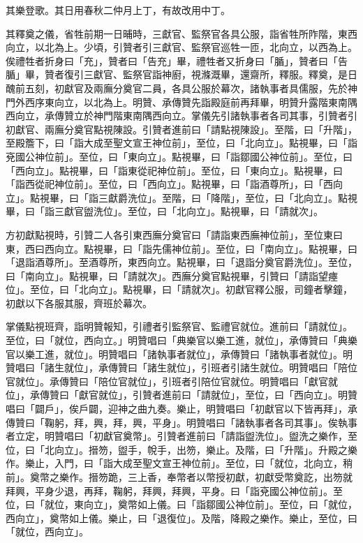 \begin{pinyinscope}
 其樂登歌。其日用春秋二仲月上丁，有故改用中丁。



 其釋奠之儀，省牲前期一日晡時，三獻官、監祭官各具公服，詣省牲所阼階，東西向立，以北為上。少頃，引贊者引三獻官、監祭官巡牲一匝，北向立，以西為上。俟禮牲者折身曰「充」，贊者曰「告充」畢，禮牲者又折身曰「腯」，贊者曰「告腯」畢，贊者復引三獻官、監祭官詣神廚，視滌溉畢，還齋所，釋服。釋奠，是日醜前五刻，初獻官及兩廡分奠官二員，各具公服於幕次，諸執事者具儒服，先於神門外西序東向立，以北為上。明贊、承傳贊先詣殿庭前再拜畢，明贊升露階東南隅西向立，承傳贊立於神門階東南隅西向立。掌儀先引諸執事者各司其事，引贊者引初獻官、兩廡分奠官點視陳設。引贊者進前曰「請點視陳設」。至階，曰「升階」，至殿簷下，曰「詣大成至聖文宣王神位前」，至位，曰「北向立」。點視畢，曰「詣兗國公神位前」。至位，曰「東向立」。點視畢，曰「詣鄒國公神位前」。至位，曰「西向立」。點視畢，曰「詣東從祀神位前」。至位，曰「東向立」。點視畢，曰「詣西從祀神位前」。至位，曰「西向立」。點視畢，曰「詣酒尊所」，曰「西向立」。點視畢，曰「詣三獻爵洗位」。至階，曰「降階」，至位，曰「北向立」。點視畢，曰「詣三獻官盥洗位」。至位，曰「北向立」。點視畢，曰「請就次」。



 方初獻點視時，引贊二人各引東西廡分奠官曰「請詣東西廡神位前」，至位東曰東，西曰西向立。點視畢，曰「詣先儒神位前」。至位，曰「南向立」。點視畢，曰「退詣酒尊所」。至酒尊所，東西向立。點視畢，曰「退詣分奠官爵洗位」。至位，曰「南向立」。點視畢，曰「請就次」。西廡分奠官點視畢，引贊曰「請詣望瘞位」。至位，曰「北向立」。點視畢，曰「請就次」。初獻官釋公服，司鐘者擊鐘，初獻以下各服其服，齊班於幕次。



 掌儀點視班齊，詣明贊報知，引禮者引監祭官、監禮官就位。進前曰「請就位」。至位，曰「就位，西向立。」明贊唱曰「典樂官以樂工進，就位」，承傳贊曰「典樂官以樂工進，就位」。明贊唱曰「諸執事者就位」，承傳贊曰「諸執事者就位」。明贊唱曰「諸生就位」，承傳贊曰「諸生就位」，引班者引諸生就位。明贊唱曰「陪位官就位」。承傳贊曰「陪位官就位」，引班者引陪位官就位。明贊唱曰「獻官就位」，承傳贊曰「獻官就位」，引贊者進前曰「請就位」，至位，曰「西向立」。明贊唱曰「闢戶」，俟戶闢，迎神之曲九奏。樂止，明贊唱曰「初獻官以下皆再拜」，承傳贊曰「鞠躬，拜，興，拜，興，平身」。明贊唱曰「諸執事者各司其事」。俟執事者立定，明贊唱曰「初獻官奠幣」。引贊者進前曰「請詣盥洗位」。盥洗之樂作，至位，曰「北向立」。搢笏，盥手，帨手，出笏，樂止。及階，曰「升階」。升殿之樂作。樂止，入門，曰「詣大成至聖文宣王神位前」。至位，曰「就位，北向立，稍前」。奠幣之樂作。搢笏跪，三上香，奉幣者以幣授初獻，初獻受幣奠訖，出笏就拜興，平身少退，再拜，鞠躬，拜興，拜興，平身。曰「詣兗國公神位前」。至位，曰「就位，東向立」，奠幣如上儀。曰「詣鄒國公神位前」。至位，曰「就位，西向立」，奠幣如上儀。樂止，曰「退復位」。及階，降殿之樂作。樂止，至位，曰「就位，西向立」。




\end{pinyinscope}

